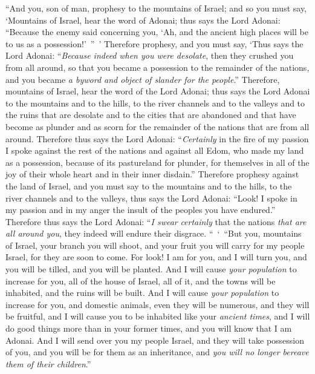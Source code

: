 \begin{biblechapter} %
 “And you, son of man, prophesy to the mountains of Israel; and so you must say, ‘Mountains of Israel, hear the word of Adonai;
\verse thus says the Lord Adonai: “Because the enemy said concerning you, ‘Ah, and the ancient high places will be to us as a possession!’ ” ’
\verse Therefore prophesy, and you must say, ‘Thus says the Lord Adonai: “\textit{Because indeed} \textit{when you were desolate}, then they crushed you from all around, so that you became a possession to the remainder of the nations, and you became \textit{a byword and object of slander for the people}.”
\verse Therefore, mountains of Israel, hear the word of the Lord Adonai; thus says the Lord Adonai to the mountains and to the hills, to the river channels and to the valleys and to the ruins that are desolate and to the cities that are abandoned and that have become as plunder and as scorn for the remainder of the nations that are from all around.
\verse Therefore thus says the Lord Adonai: “\textit{Certainly} in the fire of my passion I spoke against the rest of the nations and against all Edom, who made my land as a possession, because of its pastureland for plunder, for themselves in all of the joy of their whole heart and in their inner disdain.”
\verse Therefore prophesy against the land of Israel, and you must say to the mountains and to the hills, to the river channels and to the valleys, thus says the Lord Adonai: “Look! I spoke in my passion and in my anger the insult of the peoples you have endured.”
\verse Therefore thus says the Lord Adonai: “\textit{I swear} \textit{certainly} that the nations \textit{that are all around you}, they indeed will endure their disgrace.
\verse “ ‘ “But you, mountains of Israel, your branch you will shoot, and your fruit you will carry for my people Israel, for they are soon to come.
\verse For look! I am for you, and I will turn you, and you will be tilled, and you will be planted.
\verse And I will cause \textit{your population} to increase for you, all of the house of Israel, all of it, and the towns will be inhabited, and the ruins will be built.
\verse And I will cause \textit{your population} to increase for you, and domestic animals, even they will be numerous, and they will be fruitful, and I will cause you to be inhabited like your \textit{ancient times}, and I will do good things more than in your former times, and you will know that I am Adonai.
\verse And I will send over you my people Israel, and they will take possession of you, and you will be for them as an inheritance, and \textit{you will no longer bereave them of their children}.”

\end{biblechapter}

